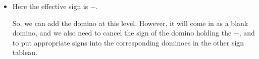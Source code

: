 \documentclass[12pt]{article}
\numberwithin{equation}{section}
\newcommand{\horizontalDominoMaybe}[3]{\filldraw [dominoMaybeStyle] (#2 - 1 + \eps, #1 - 1 + \eps) rectangle + (2 - \teps, 1 -\teps) node [dominoText] {$#3$};}
\newcommand{\verticalDominoMaybeShift}[4]{\filldraw [dominoMaybeStyle] (#2 - 1 + #4 + \eps,  #1 - 1 + \eps) rectangle + (1 - \teps,2 -\teps) node [dominoText] {$#3$};}
\begin{document}
\begin{itemize}
\begin{itemize}
\begin{itemize}
        \item Here the effective sign is $-$.
        \begin{figure}[H]
          \centering
        \end{figure}
        So, we can add the domino at this level.
        However, it will come in as a blank domino, and we also need to cancel the sign of the domino holding the $-$, and to put appropriate signs into the corresponding dominoes in the other sign tableau.
        \begin{figure}[H]
          \centering
        \end{figure}


\end{itemize}
\end{itemize}
\end{itemize}
\end{document}
